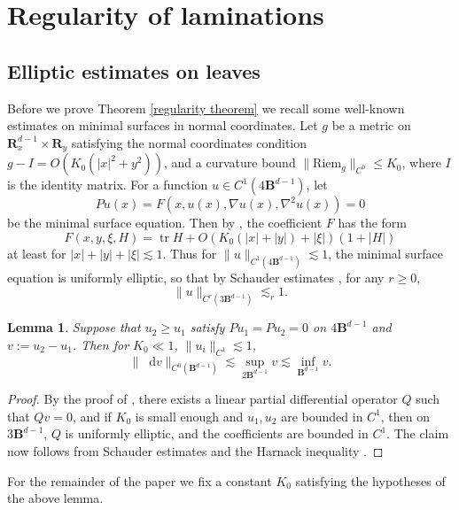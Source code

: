 \documentclass[reqno,11pt]{amsart}
\newcommand{\RR}{\mathbf{R}}
\newcommand{\Ball}{\mathbf{B}}
\newcommand*\dif{\mathop{}\!\mathrm{d}}
\DeclareMathOperator{\tr}{tr}
\newcommand{\Riem}{\mathrm{Riem}}
\newtheorem{lemma}[theorem]{Lemma}
\theoremstyle{definition}
\numberwithin{equation}{section}
\begin{document}
\section{Regularity of laminations}\label{Regularity}
\subsection{Elliptic estimates on leaves}\label{Leaf estimates}
Before we prove Theorem \ref{regularity theorem} we recall some well-known estimates on minimal surfaces in normal coordinates.
Let $g$ be a metric on $\RR^{d - 1}_x \times \RR_y$ satisfying the normal coordinates condition $g - I = O(K_0(|x|^2 + y^2))$, and a curvature bound $\|\Riem_g\|_{C^0} \leq K_0$, where $I$ is the identity matrix.
For a function $u \in C^1(4\Ball^{d - 1})$, let
$$Pu(x) = F(x, u(x), \nabla u(x), \nabla^2 u(x)) = 0$$
be the minimal surface equation.
Then by \cite[(7.21)]{colding2011course}, the coefficient $F$ has the form
$$F(x, y, \xi, H) = \tr H + O(K_0(|x| + |y|) + |\xi|)(1 + |H|)$$
at least for $|x| + |y| + |\xi| \lesssim 1$.
Thus for $\|u\|_{C^1(4\Ball^{d - 1})} \lesssim 1$, the minimal surface equation is uniformly elliptic, so that by Schauder estimates \cite[Theorem 6.2]{gilbarg2015elliptic}, for any $r \geq 0$,
\begin{equation}\label{norms on uk}
	\|u\|_{C^r(3\Ball^{d - 1})} \lesssim_r 1.
\end{equation}

\begin{lemma}
Suppose that $u_2 \geq u_1$ satisfy $Pu_1 = Pu_2 = 0$ on $4\Ball^{d - 1}$ and $v := u_2 - u_1$.
Then for $K_0 \ll 1$, $\|u_i\|_{C^1} \lesssim 1$, 
\begin{equation}\label{Schauder Harnack}
	\|\dif v\|_{C^0(\Ball^{d - 1})} \lesssim \sup_{2\Ball^{d - 1}} v \lesssim \inf_{\Ball^{d - 1}} v.
\end{equation}
\end{lemma}
\begin{proof}
By the proof of \cite[Theorem 7.3]{colding2011course}, there exists a linear partial differential operator $Q$ such that $Qv = 0$, and if $K_0$ is small enough and $u_1, u_2$ are bounded in $C^1$, then on $3\Ball^{d - 1}$, $Q$ is uniformly elliptic, and the coefficients are bounded in $C^1$.
The claim now follows from Schauder estimates and the Harnack inequality \cite[Corollary 9.25]{gilbarg2015elliptic}.
\end{proof}

For the remainder of the paper we fix a constant $K_0$ satisfying the hypotheses of the above lemma.
\end{document}
